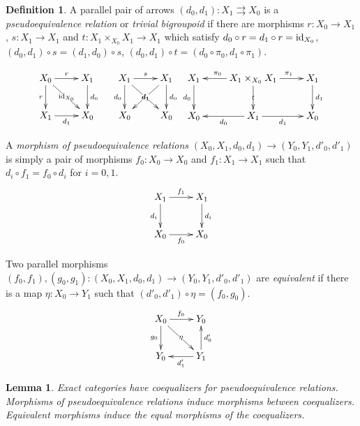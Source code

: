\documentclass[sort&compress]{elsarticle}
\theoremstyle{plain}
\newtheorem{lemma}[theorem]{Lemma}
\theoremstyle{definition}
\newtheorem{defin}[theorem]{Definition}
\theoremstyle{remark}
\begin{document}
\begin{defin} A parallel pair of arrows $(d_0,d_1):X_1 \rightrightarrows X_0$ is a \emph{pseudoequivalence relation} or \emph{trivial bigroupoid} if there are morphisms $r:X_0\to X_1$, $s:X_1\to X_1$ and $t:X_1\times_{X_0} X_1\to X_1$ which satisfy $d_0\circ r = d_1\circ r = \mathrm{id}_{X_0}$, $(d_0,d_1)\circ s = (d_1,d_0)\circ s$, $(d_0,d_1)\circ t = (d_0\circ \pi_0, d_1\circ \pi_1)$.

\[ \begin{array}{ccc} 
\xymatrix{
 X_0 \ar[r]^r\ar[d]_r\ar[dr]|{\id_{X_0}} & X_1\ar[d]^{d_0} \\
 X_1 \ar[r]_{d_1} & X_0
}&
\xymatrix{
 X_1 \ar[r]^s \ar[d]_{d_0} \ar[dr]|{d_1} & X_1 \ar[dl]|{d_1} \ar[d]^{d_0} \\
 X_0 & X_0
}
\xymatrix{
 X_1\ar[d]_{d_0} & X_1\times_{X_0} X_1 \ar[l]_(.6){\pi_0}\ar[r]^(.6){\pi_1} \ar[d]|t & X_1 \ar[d]^{d_1} \\
 X_0 & X_1\ar[l]^{d_0}\ar[r]_{d_1} & X_0
}
\end{array}\]

A \emph{morphism of pseudoequivalence relations} $(X_0,X_1,d_0,d_1) \to (Y_0,Y_1,d'_0,d'_1)$ is simply a pair of morphisms $f_0: X_0\to X_0$ and $f_1:X_1\to X_1$ such that $d_i \circ f_1 = f_0 \circ d_i$ for $i=0,1$.
\[ \xymatrix{
 X_1 \ar[r]^{f_1}\ar[d]_{d_i} & X_1\ar[d]^{d_i} \\
 X_0 \ar[r]_{f_0} & X_0
} \]

Two parallel morphisms $(f_0,f_1),(g_0,g_1):(X_0,X_1,d_0,d_1) \to (Y_0,Y_1,d'_0,d'_1)$ are \emph{equivalent} if there is a map $\eta:X_0 \to Y_1$ such that $(d'_0,d'_1)\circ\eta = (f_0, g_0)$.
\[ \xymatrix{
 X_0 \ar[r]^{f_0}\ar[d]_{g_0}\ar[dr]|\eta & Y_0 \\
 Y_0 & Y_1 \ar[u]_{d'_0}\ar[l]^{d'_1}
} \]

\end{defin}


\begin{lemma} Exact categories have coequalizers for pseudoequivalence relations. Morphisms of pseudoequivalence relations induce morphisms between coequalizers. Equivalent morphisms induce the equal morphisms of the coequalizers. \end{lemma}
\end{document}

